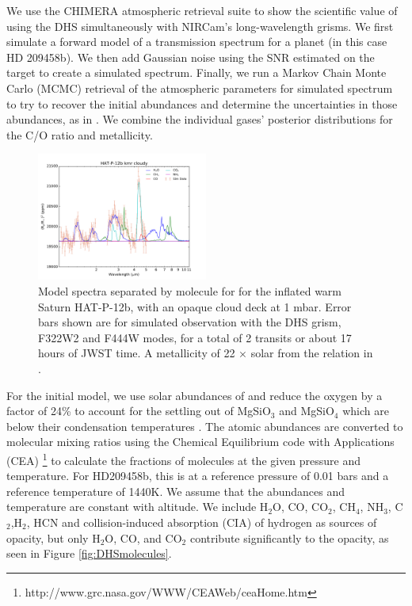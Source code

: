 \documentclass[iop]{emulateapj}
\begin{document}
We use the CHIMERA atmospheric retrieval suite \citep{line2013chimera,line2014CtOsecE} to show the scientific value of using the DHS simultaneously with NIRCam's long-wavelength grisms.
We first simulate a forward model of a transmission spectrum for a planet (in this case HD 209458b).
We then add Gaussian noise using the SNR estimated on the target to create a simulated spectrum.
Finally, we run a Markov Chain Monte Carlo (MCMC) retrieval of the atmospheric parameters for simulated spectrum to try to recover the initial abundances and determine the uncertainties in those abundances, as in \citet{greene2016jwst_trans}.
We combine the individual gases' posterior distributions for the C/O ratio and metallicity.

\begin{figure}
\centering
\includegraphics[width=0.5\textwidth]{HAT-P-12b_kmr_cloudy_dhs.pdf}
\caption{Model spectra separated by molecule for for the inflated warm Saturn HAT-P-12b, with an opaque cloud deck at 1 mbar.
Error bars shown are for simulated observation with the DHS grism, F322W2 and F444W modes, for a total of 2 transits or about 17 hours of JWST time. A metallicity of 22 $\times$ solar from the relation in \citet{kreidberg2014wasp43}.}\label{fig:DHSvsNIRISS209}
\end{figure}

For the initial model, we use solar abundances of \citet{asplund} and reduce the oxygen by a factor of 24\% to account for the settling out of MgSiO$_3$ and MgSiO$_4$ which are below their condensation temperatures \citep{sing2016continuum}.
The atomic abundances are converted to molecular mixing ratios using the Chemical Equilibrium code with Applications (CEA) \footnote{http://www.grc.nasa.gov/WWW/CEAWeb/ceaHome.htm}\citep{gordon1996cea} to calculate the fractions of molecules at the given pressure and temperature.
For HD209458b, this is at a reference pressure of 0.01 bars and a reference temperature of 1440K.
We assume that the abundances and temperature are constant with altitude.
We include H$_2$O, CO, CO$_2$, CH$_4$, NH$_3$, C$_2$,H$_2$, HCN and collision-induced absorption (CIA) of hydrogen as sources of opacity, but only H$_2$O, CO, and CO$_2$ contribute significantly to the opacity, as seen in Figure \ref{fig:DHSmolecules}.
\end{document}
